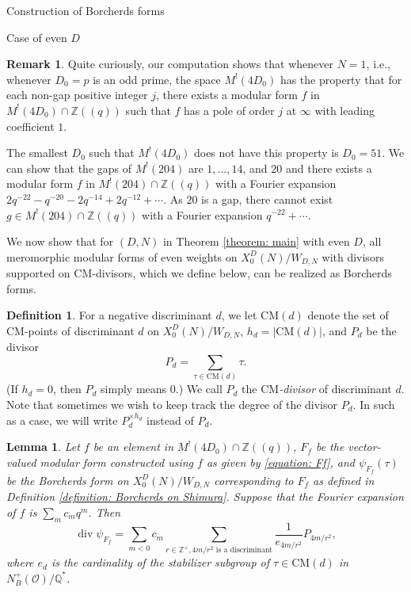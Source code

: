 \documentclass{amsart}
\newcounter{lemma}
\newtheorem{Lemma}[lemma]{Lemma}
\theoremstyle{definition}
\newtheorem{Definition}[lemma]{Definition}
\newtheorem{Remark}[lemma]{Remark}
\def\O{\mathcal O}
\def\Q{\mathbb Q}
\def\Z{\mathbb Z}
\def\CM{\mathrm{CM}}
\def\div{\operatorname{div}}
\begin{document}
\begin{section}{Construction of Borcherds forms}
\begin{subsection}{Case of even $D$}
\begin{Remark}
Quite curiously, our computation shows that whenever $N=1$, i.e.,
whenever $D_0=p$ is an odd prime, the space $M^!(4D_0)$ has the
property that for each non-gap positive integer $j$, there exists a
modular form $f$ in $M^!(4D_0)\cap\Z((q))$ such that $f$ has a pole of
order $j$ at $\infty$ with leading coefficient $1$.

The smallest $D_0$ such that $M^!(4D_0)$ does not have this property
is $D_0=51$. We can show that the gaps of $M^!(204)$ are
$1,\ldots,14$, and $20$ and there exists a modular form $f$ in
$M^!(204)\cap\Z((q))$ with a Fourier expansion
$2q^{-22}-q^{-20}-2q^{-14}+2q^{-12}+\cdots$. As $20$ is a gap, there
cannot exist $g\in M^!(204)\cap\Z((q))$ with a Fourier expansion $q^{-22}+\cdots$.
\end{Remark}

We now show that for $(D,N)$ in Theorem \ref{theorem: main} with even
$D$, all meromorphic modular forms of even
weights on $X_0^D(N)/W_{D,N}$ with divisors supported on CM-divisors,
which we define below, can be realized as Borcherds forms.

\begin{Definition} \label{definition: CM-divisor}
For a negative discriminant $d$, we
let $\CM(d)$ denote the set of CM-points of discriminant $d$ on
$X_0^D(N)/W_{D,N}$, $h_d=|\CM(d)|$, and $P_d$ be the divisor
$$
  P_d=\sum_{\tau\in\CM(d)}\tau.
$$
(If $h_d=0$, then $P_d$ simply means $0$.) We call $P_d$ the
\emph{$\CM$-divisor} of discriminant $d$. Note that sometimes we
wish to keep track the degree of the divisor $P_d$. In such as a case,
we will write $P_d^{\times h_d}$ instead of $P_d$.
\end{Definition}


\begin{Lemma} \label{lemma: divisor at infinity}
  Let $f$ be an element in $M^!(4D_0)\cap\Z((q))$, $F_f$ be the
  vector-valued modular form constructed using $f$ as given by
  \eqref{equation: Ff}, and $\psi_{F_f}(\tau)$ be the Borcherds form
  on $X_0^D(N)/W_{D,N}$ corresponding to $F_f$ as defined in
  Definition \ref{definition: Borcherds on Shimura}. Suppose that the
  Fourier expansion of $f$ is $\sum_m c_mq^m$. Then
  $$
    \div\psi_{F_f}=\sum_{m<0}c_m
    \sum_{r\in\Z^+,4m/r^2\text{ is a discriminant}}\frac1{e_{4m/r^2}}
    P_{4m/r^2},
  $$
  where $e_d$ is the cardinality of the
  stabilizer subgroup of $\tau\in\CM(d)$ in $N_B^+(\O)/\Q^\ast$.
\end{Lemma}


\end{subsection}
\end{section}
\end{document}
